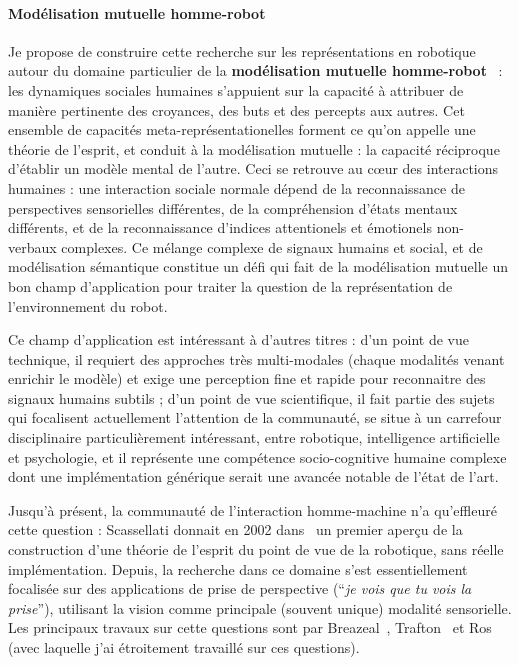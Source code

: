 \documentclass[a4paper]{article}
\begin{document}
\paragraph{Modélisation mutuelle homme-robot}


Je propose de construire cette recherche sur les représentations en robotique
autour du domaine particulier de la \textbf{modélisation mutuelle
homme-robot}~\cite{lemaignan2015mutual} :
les dynamiques sociales humaines s'appuient sur la capacité à attribuer de
manière pertinente des croyances, des buts et des percepts aux autres. Cet
ensemble de capacités meta-représentationelles forment ce qu'on appelle une
théorie de l'esprit, et conduit à la modélisation mutuelle : la capacité
réciproque d'établir un modèle mental de l'autre. Ceci se retrouve au c\oe ur
des interactions humaines : une interaction sociale normale dépend de la
reconnaissance de perspectives sensorielles différentes, de la compréhension
d'états mentaux différents, et de la reconnaissance d'indices attentionels et
émotionels non-verbaux complexes.  Ce mélange complexe de signaux humains et
social, et de modélisation sémantique constitue un défi qui fait de la
modélisation mutuelle un bon champ d'application pour traiter la question de la
représentation de l'environnement du robot.

Ce champ d'application est intéressant à d'autres titres : d'un point de vue
technique, il requiert des approches très multi-modales (chaque modalités venant
enrichir le modèle) et exige une perception fine et rapide pour reconnaitre des
signaux humains subtils ; d'un point de vue scientifique, il fait partie des
sujets qui focalisent actuellement l'attention de la communauté, se situe à un
carrefour disciplinaire particulièrement intéressant, entre robotique,
intelligence artificielle et psychologie, et il représente une compétence
socio-cognitive humaine complexe dont une implémentation générique serait une
avancée notable de l'état de l'art.

Jusqu'à présent, la communauté de l'interaction homme-machine n'a qu'effleuré
cette question : Scassellati donnait en 2002 dans~\cite{scassellati2002theory}
un premier aperçu de la construction d'une théorie de l'esprit du point de vue
de la robotique, sans réelle implémentation. Depuis, la recherche dans ce
domaine s'est essentiellement focalisée sur des applications de prise de
perspective (``\emph{je vois que tu vois la prise}''), utilisant la vision comme
principale (souvent unique) modalité sensorielle. Les principaux travaux sur
cette questions sont par Breazeal~\cite{breazeal2006using},
Trafton~\cite{Trafton2005} et Ros~\cite{Ros2010} (avec laquelle j'ai étroitement
travaillé sur ces questions).
\end{document}
